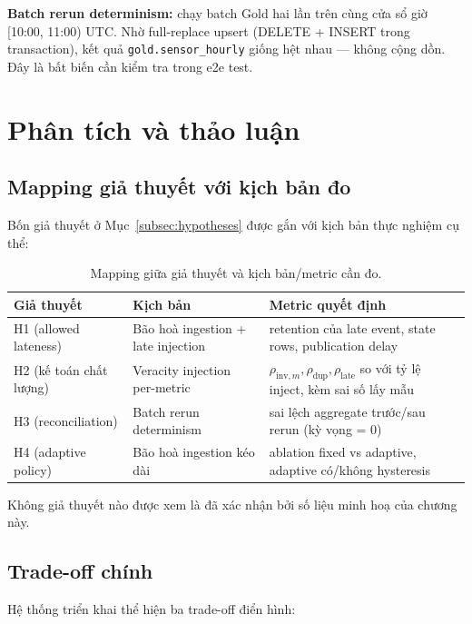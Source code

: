 \textbf{Batch rerun determinism:} chạy batch Gold hai lần trên cùng cửa sổ
giờ [10:00, 11:00) UTC. Nhờ full-replace upsert (DELETE + INSERT trong
transaction), kết quả \texttt{gold.sensor\_hourly} giống hệt nhau --- không
cộng dồn. Đây là bất biến cần kiểm tra trong e2e test.

\section{Phân tích và thảo luận}

\subsection{Mapping giả thuyết với kịch bản đo}
\label{subsec:hypothesis-mapping}

Bốn giả thuyết ở Mục~\ref{subsec:hypotheses} được gắn với kịch bản thực
nghiệm cụ thể:

\begin{table}[H]
\centering
\caption{Mapping giữa giả thuyết và kịch bản/metric cần đo.}
\label{tab:hypothesis-mapping}
\begin{tabularx}{\textwidth}{l l X}
\toprule
\textbf{Giả thuyết} & \textbf{Kịch bản} & \textbf{Metric quyết định} \\
\midrule
H1 (allowed lateness) & Bão hoà ingestion + late injection &
  retention của late event, state rows, publication delay \\
H2 (kế toán chất lượng) & Veracity injection per-metric &
  $\rho_{\mathrm{inv},m}, \rho_{\mathrm{dup}}, \rho_{\mathrm{late}}$ so với tỷ lệ
  inject, kèm sai số lấy mẫu \\
H3 (reconciliation) & Batch rerun determinism &
  sai lệch aggregate trước/sau rerun (kỳ vọng = 0) \\
H4 (adaptive policy) & Bão hoà ingestion kéo dài &
  ablation fixed vs adaptive, adaptive có/không hysteresis \\
\bottomrule
\end{tabularx}
\end{table}

Không giả thuyết nào được xem là đã xác nhận bởi số liệu minh hoạ của chương
này.

\subsection{Trade-off chính}

Hệ thống triển khai thể hiện ba trade-off điển hình:

